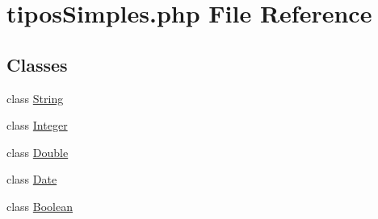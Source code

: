 \hypertarget{tipos_simples_8php}{
\section{tiposSimples.php File Reference}
\label{tipos_simples_8php}
}
\subsection*{Classes}
\begin{CompactItemize}
\item 
class \hyperlink{class_string}{String}
\item 
class \hyperlink{class_integer}{Integer}
\item 
class \hyperlink{class_double}{Double}
\item 
class \hyperlink{class_date}{Date}
\item 
class \hyperlink{class_boolean}{Boolean}
\end{CompactItemize}
